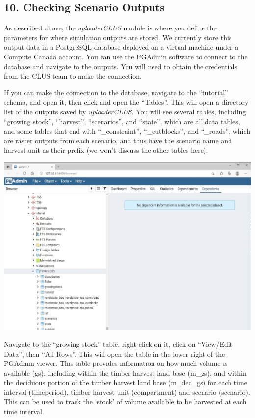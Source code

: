 \documentclass[
]{article}
\begin{document}
\hypertarget{checking-scenario-outputs}{%
\subsection{10. Checking Scenario
Outputs}\label{checking-scenario-outputs}}

As described above, the \emph{uploaderCLUS} module is where you define
the parameters for where simulation outputs are stored. We currently
store this output data in a PostgreSQL database deployed on a virtual
machine under a Compute Canada account. You can use the PGAdmin software
to connect to the database and navigate to the outputs. You will need to
obtain the credentials from the CLUS team to make the connection.

If you can make the connection to the database, navigate to the
``tutorial'' schema, and open it, then click and open the ``Tables''.
This will open a directory list of the outputs saved by
\emph{uploaderCLUS}. You will see several tables, including ``growing
stock'', ``harvest'', ``scenarios'', and ``state'', which are all data
tables, and some tables that end with ``\_constraint'', ``\_cutblocks'',
and ``\_roads'', which are raster outputs from each scenario, and thus
have the scenario name and harvest unit as their prefix (we won't
discuss the other tables here).

\includegraphics{images/pgadmin_output.jpg}

Navigate to the ``growing stock'' table, right click on it, click on
``View/Edit Data'', then ``All Rows''. This will open the table in the
lower right of the PGAdmin viewer. This table provides information on
how much volume is available (gs), including within the timber harvest
land base (m\_gs), and within the deciduous portion of the timber
harvest land base (m\_dec\_gs) for each time interval (timeperiod),
timber harvest unit (compartment) and scenario (scenario). This can be
used to track the `stock' of volume available to be harvested at each
time interval.
\end{document}
